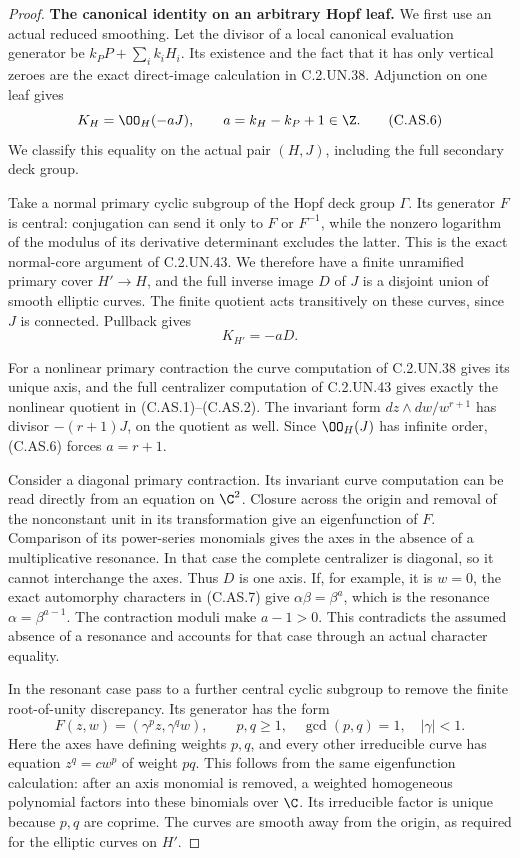 \begin{proof}
\par\medskip\noindent\textbf{The canonical identity on an arbitrary Hopf leaf.}
We first use an actual reduced smoothing. Let the divisor
of a local canonical evaluation generator be
$k_PP+\sum_i k_iH_i$. Its existence and the fact that it
has only vertical zeroes are the exact direct-image
calculation in C.2.UN.38. Adjunction on one leaf gives
\[
                  K_H=\OO_H(-aJ),\qquad
                  a=k_H-k_P+1\in\Z.                      \tag{C.AS.6}
\]
We classify this equality on the actual pair $(H,J)$,
including the full secondary deck group.

Take a normal primary cyclic subgroup of the Hopf deck
group $\Gamma$. Its generator $F$ is central: conjugation
can send it only to $F$ or $F^{-1}$, while the nonzero
logarithm of the modulus of its derivative determinant
excludes the latter. This is the exact normal-core
argument of C.2.UN.43. We therefore have a finite
unramified primary cover $H'\to H$, and the full inverse
image $D$ of $J$ is a disjoint union of smooth elliptic
curves. The finite quotient acts transitively on these
curves, since $J$ is connected. Pullback gives
\[
                           K_{H'}=-aD.                  \tag{C.AS.7}
\]

For a nonlinear primary contraction the curve computation
of C.2.UN.38 gives its unique axis, and the full
centralizer computation of C.2.UN.43 gives exactly the
nonlinear quotient in (C.AS.1)--(C.AS.2).
The invariant form $dz\wedge dw/w^{r+1}$ has divisor
$-(r+1)J$, on the quotient as well. Since $\OO_H(J)$ has
infinite order, (C.AS.6) forces $a=r+1$.

Consider a diagonal primary contraction. Its invariant
curve computation can be read directly from an equation
on $\C^2$. Closure across the origin and removal of the
nonconstant unit in its transformation give an eigenfunction
of $F$. Comparison of its power-series monomials gives
the axes in the absence of a multiplicative resonance.
In that case the complete centralizer is diagonal, so
it cannot interchange the axes. Thus $D$ is one axis.
If, for example, it is $w=0$, the exact automorphy
characters in (C.AS.7) give
$\alpha\beta=\beta^a$, which is the resonance
$\alpha=\beta^{a-1}$. The contraction moduli make
$a-1>0$. This contradicts the assumed absence of a
resonance and accounts for that case through an actual
character equality.

In the resonant case pass to a further central cyclic
subgroup to remove the finite root-of-unity discrepancy.
Its generator has the form
\[
                 F(z,w)=(\gamma^p z,\gamma^q w),
       \qquad p,q\ge1,\quad\gcd(p,q)=1,\quad |\gamma|<1 .
                                                               \tag{C.AS.8}
\]
Here the axes have defining weights $p,q$, and every
other irreducible curve has equation $z^q=cw^p$ of
weight $pq$. This follows from the same eigenfunction
calculation: after an axis monomial is removed, a
weighted homogeneous polynomial factors into these
binomials over $\C$. Its irreducible factor is unique
because $p,q$ are coprime. The curves are smooth away
from the origin, as required for the elliptic curves
on $H'$.


\end{proof}
